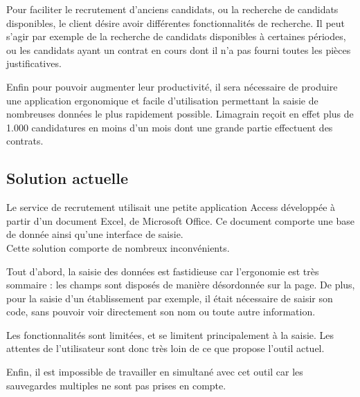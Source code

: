 Pour faciliter le recrutement d'anciens candidats, ou la recherche de candidats disponibles, le client désire avoir différentes fonctionnalités de recherche.
Il peut s'agir par exemple de la recherche de candidats disponibles à certaines périodes, ou les candidats ayant un contrat en cours dont il n'a pas fourni toutes les pièces justificatives.

Enfin pour pouvoir augmenter leur productivité, il sera nécessaire de produire une application ergonomique et facile d'utilisation permettant la saisie de nombreuses données le plus rapidement possible.
Limagrain reçoit en effet plus de 1.000 candidatures en moins d'un mois dont une grande partie effectuent des contrats.


\subsection{Solution actuelle}

Le service de recrutement utilisait une petite application Access développée à partir d'un document Excel, de Microsoft Office.
Ce document comporte une base de donnée ainsi qu'une interface de saisie.
\\

Cette solution comporte de nombreux inconvénients.

Tout d'abord, la saisie des données est fastidieuse car l'ergonomie est très sommaire : les champs sont disposés de manière désordonnée sur la page.
De plus, pour la saisie d'un établissement par exemple, il était nécessaire de saisir son code, sans pouvoir voir directement son nom ou toute autre information.

Les fonctionnalités sont limitées, et se limitent principalement à la saisie.
Les attentes de l'utilisateur sont donc très loin de ce que propose l'outil actuel.

Enfin, il est impossible de travailler en simultané avec cet outil car les sauvegardes multiples ne sont pas prises en compte.


